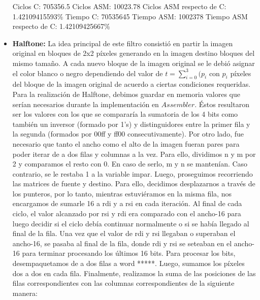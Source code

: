 \documentclass[10pt, a4paper]{article}
\begin{document}
\begin{itemize}
Ciclos C:                 705356.5\newline
Ciclos ASM:               10023.78\newline
Ciclos ASM respecto de C: 1.42109415593\% \newline
Tiempo C:                 70535645\newline
Tiempo ASM:               1002378\newline
Tiempo ASM respecto de C: 1.42109425667\% \newline

\item {\textbf{Halftone:}}
La idea principal de este filtro consistió en partir la imagen original en bloques de 2x2 píxeles generando en la imagen destino bloques del mismo tamaño. A cada nuevo bloque de la imagen original se le debió asignar el color blanco o negro dependiendo del valor de $t = \sum_{i=0}^{3} {(p_{i}}$ con $p_{i}$ píxeles del bloque de la imagen original de acuerdo a ciertas condiciones requeridas.\newline
Para la realización de Halftone, debimos guardar en memoria valores que serían necesarios durante la implementación en $Assembler$. Éstos resultaron ser los valores con los que se compararía la sumatoria de los 4 bits como también un inversor (formado por 1's) y distinguidores entre la primer fila y la segunda (formados por 00ff y ff00 consecutivamente).\newline 
Por otro lado, fue necesario que tanto el ancho como el alto de la imagen fueran pares para poder iterar de a dos filas y columnas a la vez. Para ello, dividimos n y m por 2 y comparamos el resto con 0. En caso de serlo, m y n se mantenían. Caso contrario, se le restaba 1 a la variable impar.\newline
Luego, proseguimos recorriendo las matrices de fuente y destino. Para ello, decidimos desplazarnos a través de los punteros, por lo tanto, mientras estuviéramos en la misma fila, nos encargamos de sumarle 16 a rdi y a rsi en cada iteración. Al final de cada ciclo, el valor alcanzado por rsi y rdi era comparado con el ancho-16 para luego decidir si el ciclo debía continuar normalmente o si se había llegado al final de la fila. Una vez que el valor de rdi y rsi llegaban o superaban el ancho-16, se pasaba al final de la fila, donde rdi y rsi se seteaban en el ancho-16 para terminar procesando los últimos 16 bits.\newline
Para procesar los bits, desempaquetamos de a dos filas a word *****. Luego, sumamos los píxeles dos a dos en cada fila. Finalmente, realizamos la suma de las posiciones de las filas correspondientes con las columnas correspondientes de la siguiente manera:\newline

\end{itemize}
\end{document}
